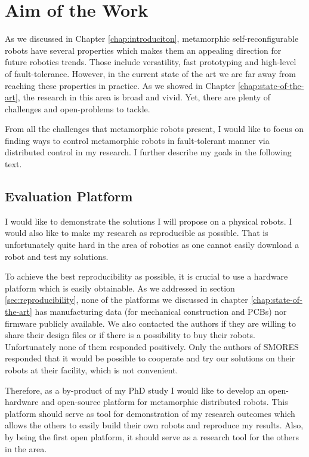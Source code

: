 \chapter{Aim of the Work}

As we discussed in Chapter \ref{chap:introduciton}, metamorphic
self-reconfigurable robots have several properties which makes them an appealing
direction for future robotics trends. Those include versatility, fast
prototyping and high-level of fault-tolerance. However, in the current state of
the art we are far away from reaching these properties in practice. As we showed
in Chapter \ref{chap:state-of-the-art}, the research in this area is broad and
vivid. Yet, there are plenty of challenges and open-problems to tackle.

From all the challenges that metamorphic robots present, I would like to focus
on finding ways to control metamorphic robots in fault-tolerant manner via
distributed control in my research. I further describe my goals in the following
text.

\section{Evaluation Platform}

I would like to demonstrate the solutions I will propose on a physical robots. I
would also like to make my research as reproducible as possible. That is
unfortunately quite hard in the area of robotics as one cannot easily download a
robot and test my solutions.

To achieve the best reproducibility as possible, it is crucial to use a hardware
platform which is easily obtainable. As we addressed in section
\ref{sec:reproducibility}, none of the platforms we discussed in chapter
\ref{chap:state-of-the-art} has manufacturing data (for mechanical construction
and PCBs) nor firmware publicly available. We also contacted the authors if they
are willing to share their design files or if there is a possibility to buy
their robots. Unfortunately none of them responded positively. Only the authors
of SMORES \cite{DBLP:conf/iros/DaveyKY12} responded that it would be possible to
cooperate and try our solutions on their robots at their facility, which is not
convenient.

Therefore, as a by-product of my PhD study I would like to develop an
open-hardware and open-source platform for metamorphic distributed robots. This
platform should serve as tool for demonstration of my research outcomes which
allows the others to easily build their own robots and reproduce my results.
Also, by being the first open platform, it should serve as a research tool for
the others in the area.

